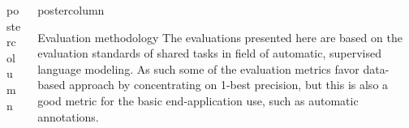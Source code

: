 \documentclass[final,hyperref={pdfpagelabels}]{beamer}
\newlength{\columnheight}
\begin{document}
\begin{frame}
\begin{columns}
\begin{column}{.49\textwidth}
\begin{beamercolorbox}[center,wd=\textwidth]{postercolumn}
\begin{minipage}[T]{.95\textwidth}
{         }
        \end{minipage}
      \end{beamercolorbox}
  \end{column}

   \begin{column}{.49\textwidth}
      \begin{beamercolorbox}[center,wd=\textwidth]{postercolumn}
        \begin{minipage}[T]{.95\textwidth} %
          \parbox[t][\columnheight]{\textwidth}{%

        \begin{block}{Evaluation methodology}
            The evaluations presented here are based on the evaluation standards
            of shared tasks in field of automatic, supervised language modeling.
            As such some of the evaluation metrics favor data-based approach
            by concentrating on 1-best precision, but this is also a good metric
            for the basic end-application use, such as automatic annotations.
        \end{block}

}
\end{minipage}
\end{beamercolorbox}
\end{column}
\end{columns}
\end{frame}
\end{document}
